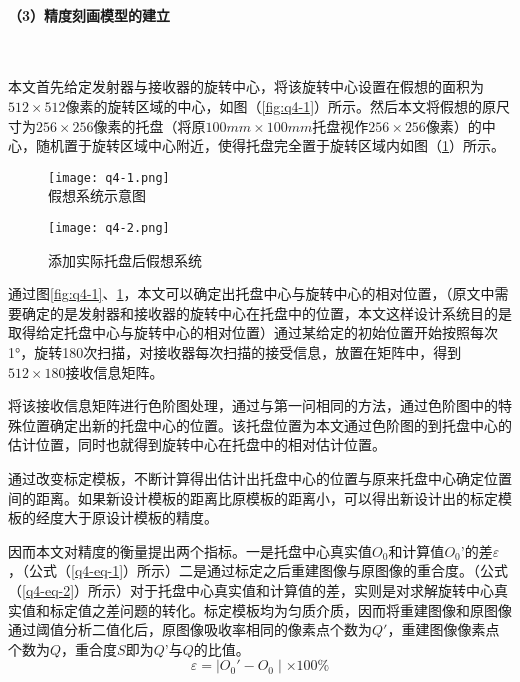 \documentclass[withoutpreface,bwprint]{cumcmthesis} %
\begin{document}
\paragraph*{（3）精度刻画模型的建立}~\\
\par 本文首先给定发射器与接收器的旋转中心，将该旋转中心设置在假想的面积为$512\times 512$像素的旋转区域的中心，如图（\ref{fig:q4-1}）所示。然后本文将假想的原尺寸为$256\times 256$像素的托盘（将原$100mm\times 100mm$托盘视作$256\times 256$像素）的中心，随机置于旋转区域中心附近，使得托盘完全置于旋转区域内如图（\ref{fig:q4-2}）所示。

\begin{figure}[!htbp]  
\begin{minipage}[t]{0.5\textwidth}
\centering  
\texttt{[image: q4-1.png]} \\
\caption{假想系统示意图} \label{fig:q4-1}
\end{minipage}
\hspace{1ex}
\begin{minipage}[t]{0.5\textwidth}  
\centering  
\texttt{[image: q4-2.png]}\\
\caption{添加实际托盘后假想系统} \label{fig:q4-2}
\end{minipage}  
\end{figure} 


\par 通过图\ref{fig:q4-1}、\ref{fig:q4-2}，本文可以确定出托盘中心与旋转中心的相对位置，（原文中需要确定的是发射器和接收器的旋转中心在托盘中的位置，本文这样设计系统目的是取得给定托盘中心与旋转中心的相对位置）通过某给定的初始位置开始按照每次1°，旋转180次扫描，对接收器每次扫描的接受信息，放置在矩阵中，得到$512\times 180$接收信息矩阵。
\par 将该接收信息矩阵进行色阶图处理，通过与第一问相同的方法，通过色阶图中的特殊位置确定出新的托盘中心的位置。该托盘位置为本文通过色阶图的到托盘中心的估计位置，同时也就得到旋转中心在托盘中的相对估计位置。
\par 通过改变标定模板，不断计算得出估计出托盘中心的位置与原来托盘中心确定位置间的距离。如果新设计模板的距离比原模板的距离小，可以得出新设计出的标定模板的经度大于原设计模板的精度。

\par 因而本文对精度的衡量提出两个指标。一是托盘中心真实值$O_0$和计算值$O_0’$的差$\varepsilon$，（公式（\ref{q4-eq-1}）所示）二是通过标定之后重建图像与原图像的重合度。（公式（\ref{q4-eq-2}）所示）对于托盘中心真实值和计算值的差，实则是对求解旋转中心真实值和标定值之差问题的转化。标定模板均为匀质介质，因而将重建图像和原图像通过阈值分析二值化后，原图像吸收率相同的像素点个数为$Q'$，重建图像像素点个数为$Q$，重合度$S$即为$Q’$与$Q$的比值。
\begin{equation}
	\label{q4-eq-1}
	\varepsilon = \mid O_0' - O_0 \mid \times 100\%
\end{equation}
\end{document}
